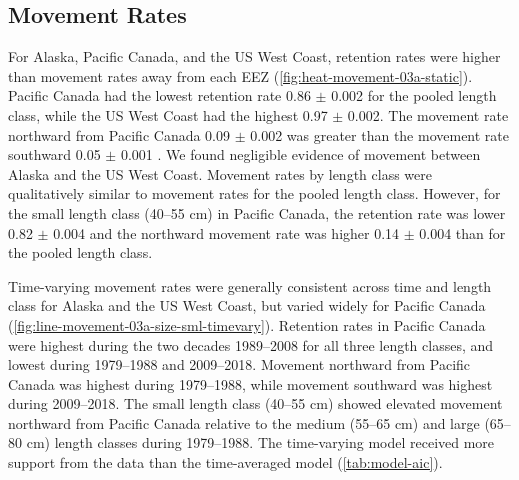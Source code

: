 \documentclass{article}
\begin{document}
\subsection{Movement Rates}
For Alaska, Pacific Canada, and the US West Coast, retention rates were higher than movement rates away from each EEZ (\autoref{fig:heat-movement-03a-static}). Pacific Canada had the lowest retention rate \num{0.86} $\pm$ \num{0.002}  for the pooled length class, while the US West Coast had the highest \num{0.97} $\pm$ \num{0.002}. The movement rate northward from Pacific Canada \num{0.09} $\pm$ \num{0.002}  was greater than the movement rate southward \num{0.05} $\pm$ \num{0.001} . We found negligible evidence of movement between Alaska and the US West Coast. Movement rates by length class were qualitatively similar to movement rates for the pooled length class. However, for the small length class (\num{40}--\num{55} cm) in Pacific Canada, the retention rate was lower \num{0.82} $\pm$ \num{0.004}  and the northward movement rate was higher \num{0.14} $\pm$ \num{0.004}  than for the pooled length class.

Time-varying movement rates were generally consistent across time and length class for Alaska and the US West Coast, but varied widely for Pacific Canada (\autoref{fig:line-movement-03a-size-sml-timevary}). Retention rates in Pacific Canada were highest during the two decades 1989--2008 for all three length classes, and lowest during 1979--1988 and 2009--2018. Movement northward from Pacific Canada was highest during 1979--1988, while movement southward was highest during 2009--2018. The small length class (\num{40}--\num{55} cm) showed elevated movement northward from Pacific Canada relative to the medium (\num{55}--\num{65} cm) and large (\num{65}--\num{80} cm) length classes during 1979--1988. The time-varying model received more support from the data than the time-averaged model (\autoref{tab:model-aic}).
\end{document}
